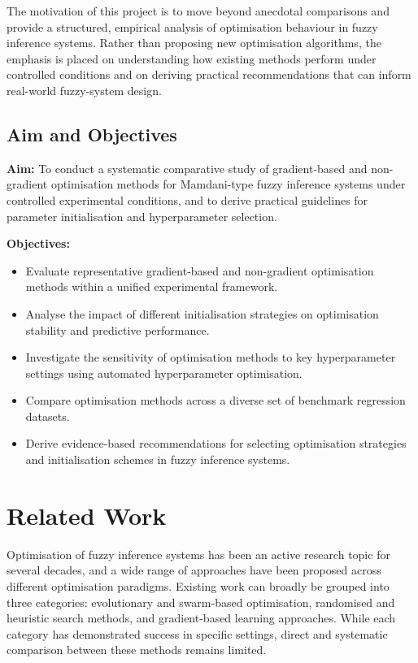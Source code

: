 \documentclass[a4paper,12pt,oneside]{article}
\begin{document}
The motivation of this project is to move beyond anecdotal comparisons and provide a structured, empirical analysis of optimisation behaviour in fuzzy inference systems. Rather than proposing new optimisation algorithms, the emphasis is placed on understanding how existing methods perform under controlled conditions and on deriving practical recommendations that can inform real-world fuzzy-system design.

\subsection{Aim and Objectives}

\textbf{Aim:}  
To conduct a systematic comparative study of gradient-based and non-gradient optimisation methods for Mamdani-type fuzzy inference systems under controlled experimental conditions, and to derive practical guidelines for parameter initialisation and hyperparameter selection.

\textbf{Objectives:}
\begin{itemize}
    \item Evaluate representative gradient-based and non-gradient optimisation methods within a unified experimental framework.
    \item Analyse the impact of different initialisation strategies on optimisation stability and predictive performance.
    \item Investigate the sensitivity of optimisation methods to key hyperparameter settings using automated hyperparameter optimisation.
    \item Compare optimisation methods across a diverse set of benchmark regression datasets.
    \item Derive evidence-based recommendations for selecting optimisation strategies and initialisation schemes in fuzzy inference systems.
\end{itemize}
\newpage

\section{Related Work}

Optimisation of fuzzy inference systems has been an active research topic for several decades, and a wide range of approaches have been proposed across different optimisation paradigms. Existing work can broadly be grouped into three categories: evolutionary and swarm-based optimisation, randomised and heuristic search methods, and gradient-based learning approaches. While each category has demonstrated success in specific settings, direct and systematic comparison between these methods remains limited.
\end{document}

